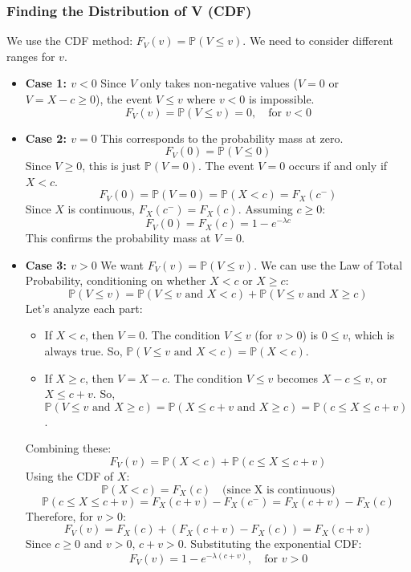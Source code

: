 \documentclass[11pt]{article}
\theoremstyle{mytheoremstyle}
\theoremstyle{mydefinitionstyle}
\newcommand{\Prob}{\mathbb{P}} %
\begin{document}
\subsubsection{Finding the Distribution of V (CDF)}
We use the CDF method: $F_V(v) = \Prob(V \le v)$. We need to consider different ranges for $v$.
\begin{itemize}
    \item \textbf{Case 1: $v < 0$}
    Since $V$ only takes non-negative values ($V=0$ or $V=X-c \ge 0$), the event $V \le v$ where $v<0$ is impossible.
    \[ F_V(v) = \Prob(V \le v) = 0, \quad \text{for } v < 0 \]

    \item \textbf{Case 2: $v = 0$}
    This corresponds to the probability mass at zero.
    \[ F_V(0) = \Prob(V \le 0) \]
    Since $V \ge 0$, this is just $\Prob(V=0)$.
    The event $V=0$ occurs if and only if $X < c$.
    \[ F_V(0) = \Prob(V=0) = \Prob(X < c) = F_X(c^-) \]
    Since $X$ is continuous, $F_X(c^-)=F_X(c)$. Assuming $c \ge 0$:
    \[ F_V(0) = F_X(c) = 1 - e^{-\lambda c} \]
    This confirms the probability mass at $V=0$.

    \item \textbf{Case 3: $v > 0$}
    We want $F_V(v) = \Prob(V \le v)$. We can use the Law of Total Probability, conditioning on whether $X < c$ or $X \ge c$:
    \[ \Prob(V \le v) = \Prob(V \le v \text{ and } X < c) + \Prob(V \le v \text{ and } X \ge c) \]
    Let's analyze each part:
    \begin{itemize}
        \item If $X < c$, then $V=0$. The condition $V \le v$ (for $v>0$) is $0 \le v$, which is always true. So, $\Prob(V \le v \text{ and } X < c) = \Prob(X < c)$.
        \item If $X \ge c$, then $V = X-c$. The condition $V \le v$ becomes $X-c \le v$, or $X \le c+v$. So, $\Prob(V \le v \text{ and } X \ge c) = \Prob(X \le c+v \text{ and } X \ge c) = \Prob(c \le X \le c+v)$.
    \end{itemize}
    Combining these:
    \[ F_V(v) = \Prob(X < c) + \Prob(c \le X \le c+v) \]
    Using the CDF of $X$:
    \[ \Prob(X < c) = F_X(c) \quad \text{(since X is continuous)} \]
    \[ \Prob(c \le X \le c+v) = F_X(c+v) - F_X(c^-) = F_X(c+v) - F_X(c) \]
    Therefore, for $v > 0$:
    \[ F_V(v) = F_X(c) + (F_X(c+v) - F_X(c)) = F_X(c+v) \]
    Since $c \ge 0$ and $v > 0$, $c+v > 0$. Substituting the exponential CDF:
    \[ F_V(v) = 1 - e^{-\lambda(c+v)}, \quad \text{for } v > 0 \]
\end{itemize}
\end{document}
